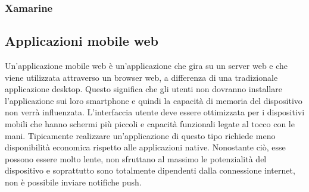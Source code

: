 \documentclass[12pt]{report}
\begin{document}
\subsubsection{Xamarine}

\subsection{Applicazioni mobile web}
Un'applicazione mobile web è un'applicazione che gira su un server web e che viene utilizzata attraverso un browser web, a differenza di una tradizionale applicazione desktop. Questo significa che gli utenti non dovranno installare l'applicazione sui loro smartphone e quindi la capacità di memoria del dispositivo non verrà influenzata. L'interfaccia utente deve essere ottimizzata per i dispositivi mobili che hanno schermi più piccoli e capacità funzionali legate al tocco con le mani. Tipicamente realizzare un'applicazione di questo tipo richiede meno disponibilità economica rispetto alle applicazioni native. Nonostante ciò, esse possono essere molto lente, non sfruttano al massimo le potenzialità del dispositivo e soprattutto sono totalmente dipendenti dalla connessione internet, non è possibile inviare notifiche push.
\end{document}
